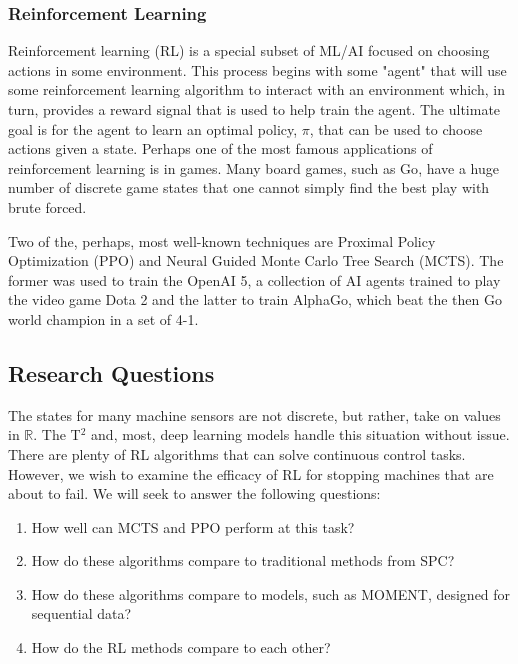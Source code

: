 \documentclass[12pt]{article}
\begin{document}
\subsubsection{Reinforcement Learning}
Reinforcement learning (RL) is a special subset of ML/AI focused on choosing actions in some environment\cite{sutton_reinforcement_1998}.
This process begins with some "agent" that will use some reinforcement learning algorithm to
interact with an environment which, in turn, provides a reward signal that is used to help
train the agent. The ultimate goal is for the agent to learn an optimal policy, $\pi$, that
can be used to choose actions given a state. Perhaps one of the most famous applications of
reinforcement learning is in games. Many board games, such as Go\cite{silver_mastering_2017},
have a huge number of discrete game states that one cannot simply find the best play with brute
forced.

Two of the, perhaps, most well-known techniques are Proximal Policy Optimization (PPO)\cite{Schulman2017ProximalPO} and
Neural Guided Monte Carlo Tree Search (MCTS)\cite{silver_mastering_2016}. The former was used to train the OpenAI 5, a 
collection of AI agents trained to play the video game Dota 2\cite{Berner2019Dota2W} and the latter to train AlphaGo,
which beat the then Go world champion in a set of 4-1.

\subsection{Research Questions}
The states for many machine sensors are not discrete, but rather, take on values in $\mathbb{R}$.
The T$^2$ and, most, deep learning models handle this situation without issue. There are plenty
of RL algorithms that can solve continuous control tasks\cite{Pong2018TemporalDM,Lillicrap2015ContinuousCW}.
However, we wish to examine the efficacy of RL for stopping machines that are about to fail. We
will seek to answer the following questions:

\begin{enumerate}
    \item How well can MCTS and PPO perform at this task?
    \item How do these algorithms compare to traditional methods from SPC?
    \item How do these algorithms compare to models, such as MOMENT, designed for sequential data?
    \item How do the RL methods compare to each other?
\end{enumerate}
\end{document}
